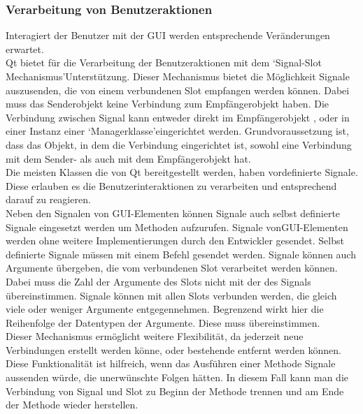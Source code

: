 \documentclass[12pt,a4paper]{article}
\begin{document}
\subsubsection{Verarbeitung von Benutzeraktionen}
Interagiert der Benutzer mit der \ac{GUI} werden entsprechende Veränderungen erwartet. \\
Qt bietet für die Verarbeitung der Benutzeraktionen mit dem \lq Signal-Slot Mechanismus\rq\space Unterstützung. Dieser Mechanismus bietet die Möglichkeit Signale auszusenden, die von einem verbundenen Slot empfangen werden können. Dabei muss das Senderobjekt keine Verbindung zum Empfängerobjekt haben. Die Verbindung zwischen Signal kann entweder direkt im Empfängerobjekt , oder in einer Instanz einer \lq Managerklasse\rq\space eingerichtet werden. Grundvoraussetzung ist, dass das Objekt, in dem die Verbindung eingerichtet ist, sowohl eine Verbindung mit dem Sender- als auch mit dem Empfängerobjekt hat.\\
Die meisten Klassen die von Qt bereitgestellt werden, haben vordefinierte Signale. Diese erlauben es die Benutzerinteraktionen zu verarbeiten und entsprechend darauf zu reagieren. \\
Neben den Signalen von \ac{GUI}-Elementen können Signale auch selbst definierte Signale eingesetzt werden um Methoden aufzurufen. Signale von\ac{GUI}-Elementen werden ohne weitere Implementierungen durch den Entwickler gesendet. Selbst definierte Signale müssen mit einem Befehl gesendet werden. Signale können auch Argumente übergeben, die vom verbundenen Slot verarbeitet werden können. Dabei muss die Zahl der Argumente des Slots nicht mit der des Signals übereinstimmen. Signale können mit allen Slots verbunden werden, die gleich viele oder weniger Argumente entgegennehmen. Begrenzend wirkt hier die Reihenfolge der Datentypen der Argumente. Diese muss übereinstimmen.\\
Dieser Mechanismus ermöglicht weitere Flexibilität, da jederzeit neue Verbindungen erstellt werden könne, oder bestehende entfernt werden können. Diese Funktionalität ist hilfreich, wenn das Ausführen einer Methode Signale aussenden würde, die unerwünschte Folgen hätten. In diesem Fall kann man die Verbindung von Signal und Slot zu Beginn der Methode trennen und am Ende der Methode wieder herstellen. \\
\end{document}

